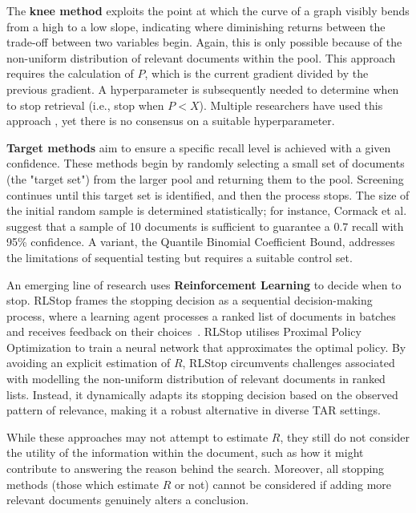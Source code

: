 \documentclass[10pt,oneside]{book}
\begin{document}
The \textbf{knee method} exploits the point at which the curve of a graph visibly bends from a high to a low slope, indicating where diminishing returns between the trade-off between two variables begin. Again, this is only possible because of the non-uniform distribution of relevant documents within the pool. This approach requires the calculation of $P$, which is the current gradient divided by the previous gradient. A hyperparameter is subsequently needed to determine when to stop retrieval (i.e., stop when $P < X$). Multiple researchers have used this approach \cite{cormack_engineering_2016, li_when_2020}, yet there is no consensus on a suitable hyperparameter.  

\textbf{Target methods} aim to ensure a specific recall level is achieved with a given confidence.  These methods begin by randomly selecting a small set of documents (the "target set") from the larger pool and returning them to the pool.  Screening continues until this target set is identified, and then the process stops.  The size of the initial random sample is determined statistically; for instance, Cormack et al. \cite{cormack_engineering_2016} suggest that a sample of 10 documents is sufficient to guarantee a 0.7 recall with 95\% confidence.  A variant, the Quantile Binomial Coefficient Bound, addresses the limitations of sequential testing  \cite{lewis_certifying_2021} but requires a suitable control set.

An emerging line of research uses \textbf{Reinforcement Learning} to decide when to stop. RLStop frames the stopping decision as a sequential decision-making process, where a learning agent processes a ranked list of documents in batches and receives feedback on their choices~\cite{bin-hezam_rlstop_2024}. RLStop utilises Proximal Policy Optimization to train a neural network that approximates the optimal policy. By avoiding an explicit estimation of $R$, RLStop circumvents challenges associated with modelling the non-uniform distribution of relevant documents in ranked lists. Instead, it dynamically adapts its stopping decision based on the observed pattern of relevance, making it a robust alternative in diverse TAR settings.

While these approaches may not attempt to estimate $R$, they still do not consider the utility of the information within the document, such as how it might contribute to answering the reason behind the search. Moreover, all stopping methods (those which estimate $R$ or not) cannot be considered if adding more relevant documents genuinely alters a conclusion. 
\end{document}
